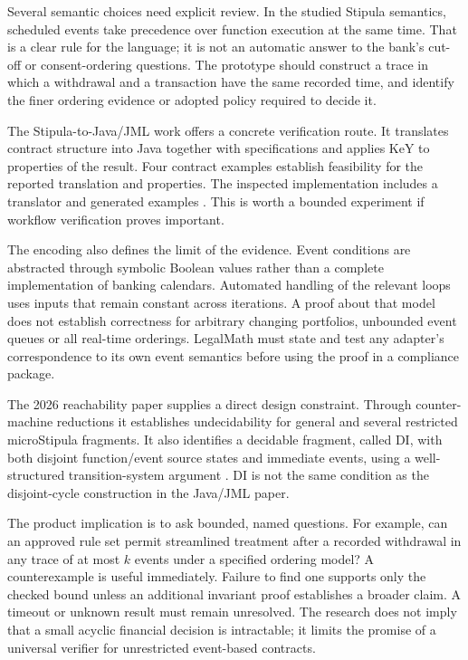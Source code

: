 Several semantic choices need explicit review. In the studied Stipula semantics,
scheduled events take precedence over function execution at the same time. That
is a clear rule for the language; it is not an automatic answer to the bank's
cut-off or consent-ordering questions. The prototype should construct a trace in
which a withdrawal and a transaction have the same recorded time, and identify
the finer ordering evidence or adopted policy required to decide it.

The Stipula-to-Java/JML work offers a concrete verification route. It translates
contract structure into Java together with specifications and applies KeY to
properties of the result. Four contract examples establish feasibility for the
reported translation and properties. The inspected implementation includes a
translator and generated examples \citep[secs.~3--4 and apps.~A--B]{stipulakey2025,stipulakeycode}.
This is worth a bounded experiment if workflow verification proves important.

The encoding also defines the limit of the evidence. Event conditions are
abstracted through symbolic Boolean values rather than a complete implementation
of banking calendars. Automated handling of the relevant loops uses inputs that
remain constant across iterations. A proof about that model does not establish
correctness for arbitrary changing portfolios, unbounded event queues or all
real-time orderings. LegalMath must state and test any adapter's correspondence
to its own event semantics before using the proof in a compliance package.

The 2026 reachability paper supplies a direct design constraint. Through
counter-machine reductions it establishes undecidability for general and several
restricted microStipula fragments. It also identifies a decidable fragment,
called DI, with both disjoint function/event source states and immediate events,
using a well-structured transition-system argument
\citep[secs.~2--4]{reachability2026}. DI is not the same condition as the
disjoint-cycle construction in the Java/JML paper.

The product implication is to ask bounded, named questions. For example, can an
approved rule set permit streamlined treatment after a recorded withdrawal in
any trace of at most $k$ events under a specified ordering model? A counterexample
is useful immediately. Failure to find one supports only the checked bound unless
an additional invariant proof establishes a broader claim. A timeout or unknown
result must remain unresolved. The research does not imply that a small acyclic
financial decision is intractable; it limits the promise of a universal verifier
for unrestricted event-based contracts.

